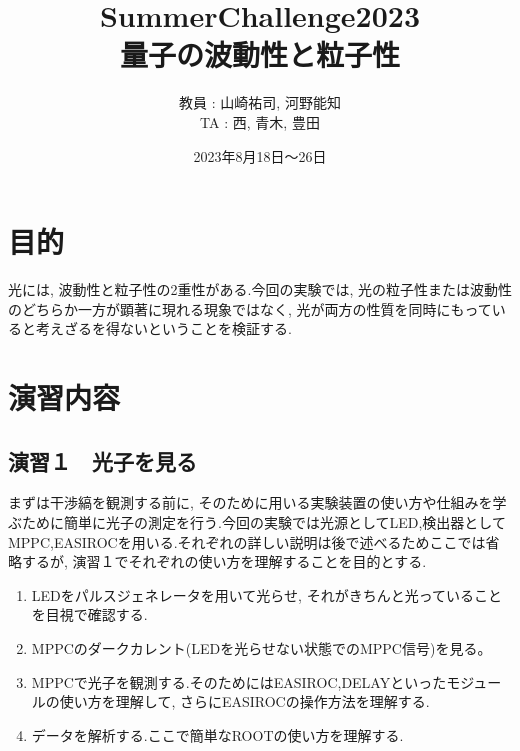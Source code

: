 \documentclass[uplatex,10pt,a4j]{jsarticle}
\begin{document}
\begin{titlepage}
  \title{SummerChallenge2023 \\ \Huge 量子の波動性と粒子性}
  \author{教員 : 山崎祐司, 河野能知 \\TA : 西, 青木, 豊田}
  \date{2023年8月18日〜26日}
  \maketitle
\end{titlepage}

\tableofcontents
\clearpage

\section{目的}
光には, 波動性と粒子性の2重性がある.今回の実験では, 光の粒子性または波動性のどちらか一方が顕著に現れる現象ではなく, 光が両方の性質を同時にもっていると考えざるを得ないということを検証する.

\section{演習内容}

\subsection{演習１　光子を見る}
まずは干渉縞を観測する前に, そのために用いる実験装置の使い方や仕組みを学ぶために簡単に光子の測定を行う.今回の実験では光源としてLED,検出器としてMPPC,EASIROCを用いる.それぞれの詳しい説明は後で述べるためここでは省略するが, 演習１でそれぞれの使い方を理解することを目的とする.
\begin{enumerate}
  \item LEDをパルスジェネレータを用いて光らせ, それがきちんと光っていることを目視で確認する.
  \item MPPCのダークカレント(LEDを光らせない状態でのMPPC信号)を見る。
  \item MPPCで光子を観測する.そのためにはEASIROC,DELAYといったモジュールの使い方を理解して, さらにEASIROCの操作方法を理解する.
  \item データを解析する.ここで簡単なROOTの使い方を理解する.
\end{enumerate}
\end{document}
